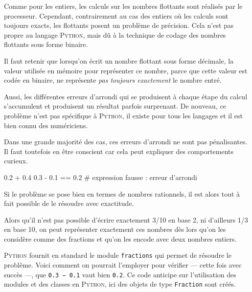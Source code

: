 Comme pour les entiers, les calculs sur les nombres flottants sont réalisés par le processeur. 
Cependant, \nopagebreak contrairement au cas des entiers où les calculs sont toujours exacts, les flottants posent un problème de précision. Cela n'est pas propre au langage \textsc{Python}, mais dû à la technique de codage des nombres flottants sous forme binaire.

Il faut retenir que lorsqu'on écrit un nombre flottant sous forme décimale, la valeur utilisée en mémoire pour représenter ce nombre, parce que cette valeur est codée en binaire, ne représente \emph{pas toujours exactement} le nombre entré.

Aussi, les différentes erreurs d'arrondi qui se produisent à chaque étape du calcul s'accumulent et produisent un résultat parfois surprenant. De nouveau, ce problème n'est pas spécifique à \textsc{Python}, il existe pour tous les langages et il est bien connu des numériciens.

Dans une grande majorité des cas, ces erreurs d'arrondi ne sont pas pénalisantes. Il faut toutefois en être conscient car cela peut expliquer des comportements curieux.

\begin{idleconsole}
	\begin{pyconsole}
		0.2 + 0.4
		0.3 - 0.1 == 0.2  # expression fausse : erreur d'arrondi
	\end{pyconsole}
\end{idleconsole}

\vspace{1pt}


Si le problème se pose bien en termes de nombres rationnels, il est alors tout à fait possible de le résoudre avec exactitude.

Alors qu'il n'est pas possible d'écrire exactement 3/10 en base 2, ni d'ailleurs 1/3 en base 10, on peut représenter exactement ces nombres dès lors qu'on les considère comme des fractions et qu'on les encode avec deux nombres entiers.

\textsc{Python} fournit en standard le module \texttt{fractions} qui permet de résoudre le problème. Voici comment on pourrait l'employer pour vérifier --- cette fois avec succès ---, que \texttt{0.3 − 0.1} vaut bien \texttt{0.2}. Ce code anticipe sur l'utilisation des modules et des classes en \textsc{Python}, ici des objets de type \texttt{Fraction} sont créés.

